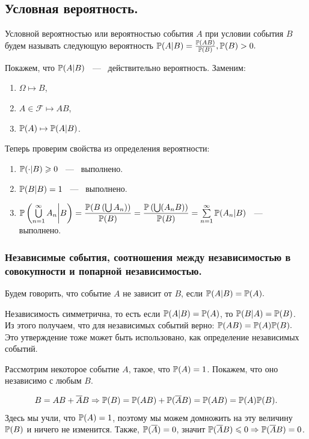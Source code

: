 \subsection{Условная вероятность.}
\begin{definition}
    Условной вероятностью или вероятностью события $A$ при условии события $B$ будем называть следующую вероятность $\P(A|B) = \frac{\P(AB)}{\P(B)}, \P(B) > 0.$
\end{definition}

\noindent Покажем, что $\P(A|B)$ ~---~ действительно вероятность. Заменим: 
\begin{enumerate}
    \item $\Omega \mapsto B$, 
    \item $A \in \mathcal{F} \mapsto AB$,
    \item $\P(A) \mapsto \P(A|B)$.
\end{enumerate}

\noindent Теперь проверим свойства из определения вероятности: 
\begin{enumerate}
    \item $\P(\cdot|B) \ge 0$ ~---~ выполнено. 
    \item $\P(B|B) = 1$ ~---~ выполнено. 
    \item $\P\left(\bigcup\limits_{n = 1}^{\infty} A_n \middle| B \right) = \dfrac{\P(B \left(\bigcup A_n\right))}{\P(B)} = \dfrac{\P\left(\bigcup(A_nB)\right)}{\P(B)} = \sum\limits_{n = 1}^{\infty} \P(A_n|B)$ ~---~ выполнено. 
\end{enumerate}

\subsubsection{Независимые события, соотношения между независимостью в совокупности и попарной независимостью.}
\begin{definition}
    Будем говорить, что событие $A$ не зависит от $B$, если $\P(A|B) = \P(A).$
\end{definition}
\noindent Независимость симметрична, то есть если $\P(A|B) = \P(A)$, то $\P(B|A) = \P(B)$. Из этого получаем, что для независимых событий верно: $\P(AB) = \P(A)\P(B).$ Это утверждение тоже может быть использовано, как определение независимых событий.

\noindent Рассмотрим некоторое событие $A$, такое, что $\P(A) = 1$. Покажем, что оно независимо с любым $B$. 

\begin{gather*}
    B = AB + \overline{A}B \Rightarrow \P(B) = \P(AB) + \P(\overline{A}B) = \P(AB) = \P(A)\P(B).
\end{gather*}
\noindent Здесь мы учли, что $\P(A) = 1$, поэтому мы можем домножить на эту величину $\P(B)$ и ничего не изменится. Также, $\P(\overline{A}) = 0$, значит $\P(\overline{A}B) \le 0 \Rightarrow \P(\overline{A}B) = 0$.

